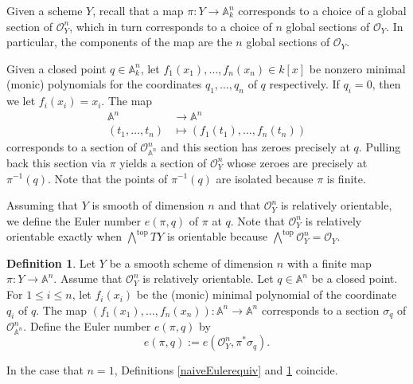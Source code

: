 \documentclass[12pt, reqno]{amsart}
\theoremstyle{definition}
\newtheorem{definition}[theorem]{Definition}
\newcommand{\A}{\mathbb{A}} %
\newcommand{\Oh}{\mathscr{O}} %
\begin{document}
Given a scheme $Y$, recall that a map $\pi: Y \rightarrow \A^n_k$ corresponds to a choice of a global section of $\Oh_Y^n$, which in turn corresponds to a choice of $n$ global sections of $\Oh_Y$. In particular, the components of the map are the $n$ global sections of $\Oh_Y$.

Given a closed point $q \in \A^n_k$, let $f_1(x_1),\ldots,f_n(x_n) \in k[x]$ be nonzero minimal (monic) polynomials for the coordinates $q_1,\ldots,q_n$ of $q$ respectively. If $q_i = 0$, then we let $f_i(x_i) = x_i$. The map
\begin{align*}
    \A^n &\rightarrow \A^n \\
    (t_1,\ldots,t_n) &\mapsto (f_1(t_1),\ldots,f_n(t_n))
\end{align*}
corresponds to a section of $\Oh_{\A^n}^n$ and this section has zeroes precisely at $q$. Pulling back this section via $\pi$ yields a section of $\Oh_Y^n$ whose zeroes are precisely at $\pi^{-1}(q)$. Note that the points of $\pi^{-1}(q)$ are isolated because $\pi$ is finite.

Assuming that $Y$ is smooth of dimension $n$ and that $\Oh_Y^n$ is relatively orientable, we define the Euler number $e(\pi, q)$ of $\pi$ at $q$. Note that $\Oh_Y^n$ is relatively orientable exactly when $\bigwedge^{\text{top}} TY$ is orientable because $\bigwedge^{\text{top}} \Oh_Y^n = \Oh_Y$.

\begin{definition} \label{def:affine euler number}
Let $Y$ be a smooth scheme of dimension $n$ with a finite map $\pi: Y \rightarrow \A^n$. Assume that $\Oh_Y^n$ is relatively orientable. Let $q \in \A^n$ be a closed point. For $1 \leq i \leq n$, let $f_i(x_i)$ be the (monic) minimal polynomial of the coordinate $q_i$ of $q$. The map $(f_1(x_1),\ldots,f_n(x_n)): \A^n \rightarrow \A^n$ corresponds to a section $\sigma_q$ of $\Oh_{\A^n}^n$. Define the Euler number $e(\pi, q)$ by
$$e(\pi,q) := e(\Oh^n_Y, \pi^* \sigma_q).$$
\end{definition}

In the case that $n = 1$, Definitions \ref{naiveEulerequiv} and \ref{def:affine euler number} coincide. 
\end{document}
